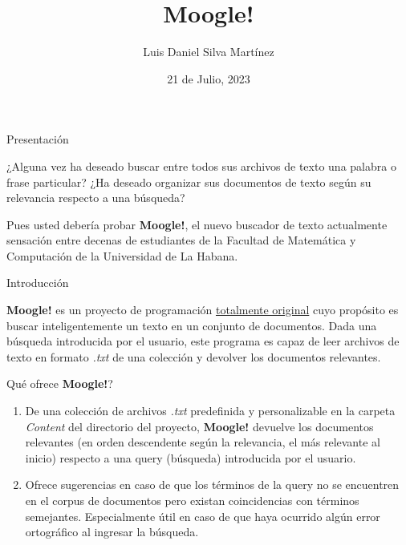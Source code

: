 \documentclass{beamer}
\title{Moogle!}
\author{Luis Daniel Silva Martínez}
\date{21 de Julio, 2023}
\begin{document}
\frame{\titlepage}

\begin{frame}{Presentación}
            \begin{center}
                \large ¿Alguna vez ha deseado buscar entre todos sus archivos de texto una palabra o frase particular? ¿Ha deseado organizar sus documentos de texto según su relevancia respecto a una búsqueda? 
            \end{center}
            \begin{center}
                \large Pues usted debería probar \textbf{Moogle!}, el nuevo buscador de texto actualmente sensación entre decenas de estudiantes de la Facultad de Matemática y Computación de la Universidad de La Habana.
            \end{center}
\end{frame}

\begin{frame}{Introducción}
    \begin{center}
    \large \textbf{Moogle!} es un proyecto de programación \underline{totalmente original} cuyo propósito
    es buscar inteligentemente un texto en un conjunto de documentos.
    Dada una búsqueda introducida por el usuario, este programa es capaz de leer
    archivos de texto en formato \emph{.txt} de una colección y devolver los documentos relevantes.
    \end{center}
\end{frame}

\begin{frame}{Qué ofrece \textbf{Moogle!}?}
    \begin{enumerate}
        \item De una colección de archivos \emph{.txt} predefinida y personalizable en la carpeta \emph{Content} del directorio del proyecto, \textbf{Moogle!} devuelve los documentos relevantes (en orden descendente según la relevancia, el más relevante al inicio) respecto a una query (búsqueda) introducida por el usuario.
        \item Ofrece sugerencias en caso de que los términos de la query no se encuentren en el corpus de documentos pero existan coincidencias con términos semejantes. Especialmente útil en caso de que haya ocurrido algún error ortográfico al ingresar la búsqueda.
    \end{enumerate}
\end{frame}
\end{document}
